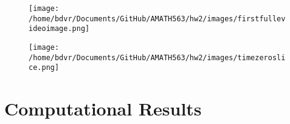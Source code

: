 \documentclass[12pt]{article}
\begin{document}
\begin{figure}[H]
	\centering
	\begin{minipage}{.5\textwidth}
		\centering
		\texttt{[image: /home/bdvr/Documents/GitHub/AMATH563/hw2/images/firstfullevideoimage.png]}
		\label{full}
	\end{minipage}%
	\begin{minipage}{.5\textwidth}
		\centering
		\texttt{[image: /home/bdvr/Documents/GitHub/AMATH563/hw2/images/timezeroslice.png]}
		\label{exslice}
	\end{minipage}
\end{figure}

\section[Look what i made]{Computational Results}
\end{document}
